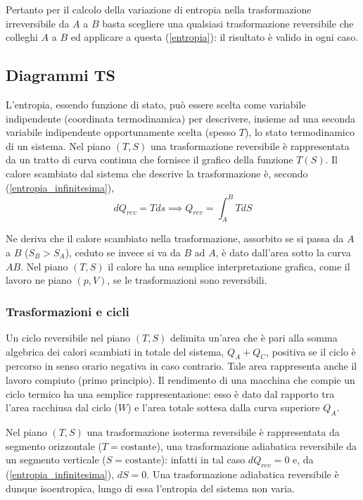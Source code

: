 \documentclass[class=book, crop=false, oneside, 12pt]{standalone}
\begin{document}
Pertanto per il calcolo della variazione di entropia nella trasformazione irreversibile da \(A\) a \(B\) basta scegliere una qualsiasi trasformazione reversibile che colleghi \(A\) a \(B\) ed applicare a questa (\ref{entropia}): il risultato è valido in ogni caso.

\subsection{Diagrammi TS}

L'entropia, essendo funzione di stato, può essere scelta come variabile indipendente (coordinata termodinamica) per descrivere, insieme ad una seconda variabile indipendente opportunamente scelta (spesso \(T\)), lo stato termodinamico di un sistema.
Nel piano \(\left(T, S\right)\) una trasformazione reversibile è rappresentata da un tratto di curva continua che fornisce il grafico della funzione \(T (S)\).
Il calore scambiato dal sistema che descrive la trasformazione è, secondo (\ref{entropia_infinitesima}),
\begin{equation}
    d Q_{rev} = T ds \implies Q_{rev} = \int_A^B T d S
\end{equation}

Ne deriva che il calore scambiato nella trasformazione, assorbito se si passa da \(A\) a \(B\) (\(S_B > S_A\)), ceduto se invece si va da \(B\) ad \(A\), è dato dall'area sotto la curva \(A B\). 
Nel piano \(\left(T, S\right)\) il calore ha una semplice interpretazione grafica, come il lavoro ne piano \(\left(p, V\right)\), se le trasformazioni sono reversibili.

\subsubsection*{Trasformazioni e cicli}

Un ciclo reversibile nel piano \(\left(T, S\right)\) delimita un'area che è pari alla somma algebrica dei calori scambiati in totale del sistema, \(Q_A + Q_C\), positiva se il ciclo è percorso in senso orario negativa in caso contrario.
Tale area rappresenta anche il lavoro compiuto (primo principio).
Il rendimento di una macchina che compie un ciclo termico ha una semplice rappresentazione: esso è dato dal rapporto tra l'area racchiusa dal ciclo (\(W\)) e l'area totale sottesa dalla curva superiore \(Q_A\). 

Nel piano \(\left(T, S\right)\) una trasformazione isoterma reversibile è rappresentata da segmento orizzontale (\(T = \text{costante}\)), una trasformazione adiabatica reversibile da un segmento verticale (\(S = \text{costante}\)): infatti in tal caso \(d Q_{rev} = 0\) e, da (\ref{entropia_infinitesima}), \(d S = 0\).
Una trasformazione adiabatica reversibile è dunque isoentropica, lungo di essa l'entropia del sistema non varia.
\end{document}
